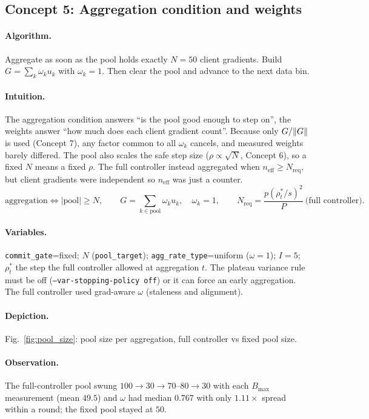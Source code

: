 \subsection{Concept 5: Aggregation condition and weights}
\paragraph{Algorithm.}
Aggregate as soon as the pool holds exactly $N{=}50$ client gradients. Build $G=\sum_k\omega_k u_k$ with $\omega_k=1$. Then clear the pool and advance to the next data bin.
\paragraph{Intuition.}
The aggregation condition answers ``is the pool good enough to step on'', the weights answer ``how much does each client gradient count''. Because
only $G/\lVert G\rVert$ is used (Concept 7), any factor common to all $\omega_k$ cancels, and measured weights barely differed.
The pool also scales the safe step size ($\rho\propto\sqrt N$, Concept 6), so a fixed $N$ means a fixed $\rho$. The full controller instead
aggregated when $n_{\mathrm{eff}}\ge N_{\mathrm{req}}$, but client gradients were independent so $n_{\mathrm{eff}}$ was just a counter.
\begin{equation}
\text{aggregation}\iff|\text{pool}|\ge N,\qquad G=\sum_{k\in\text{pool}}\omega_k u_k,\quad \omega_k=1,\qquad
N_{\mathrm{req}}=\frac{p(\rho^*_t/s)^2}{P}\ \text{(full controller)} .
\end{equation}
\paragraph{Variables.}
\texttt{commit\_gate}=fixed; $N$ (\texttt{pool\_target}); \texttt{agg\_rate\_type}=uniform ($\omega=1$); $I=5$; $\rho^*_t$ the step the full controller allowed at aggregation $t$. The plateau variance rule must be off (\texttt{--var-stopping-policy off}) or it can force an early aggregation.
The full controller used grad-aware $\omega$ (staleness and alignment).
\paragraph{Depiction.} Fig.~\ref{fig:pool_size}: pool size per aggregation, full controller vs fixed pool size.
\paragraph{Observation.}
The full-controller pool swung $100\to30\to70$--$80\to30$ with each $B_{\max}$ measurement (mean $49.5$) and $\omega$ had median $0.767$ with only $1.11\times$ spread within a round; the fixed pool stayed at $50$.

